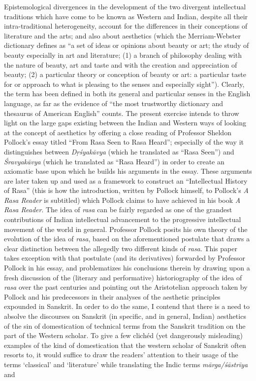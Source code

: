 Epistemological divergences in the development of the two divergent intellectual traditions which have come to be known as Western and Indian, despite all their intra-traditional heterogeneity, account for the differences in their conceptions of literature and the arts; and also about aesthetics (which the Merriam-Webster dictionary defines as “a set of ideas or opinions about beauty or art; the study of beauty especially in art and literature; (1) a branch of philosophy dealing with the nature of beauty, art and taste and with the creation and appreciation of beauty; (2) a particular theory or conception of beauty or art: a particular taste for or approach to what is pleasing to the senses and especially sight”). Clearly, the term has been defined in both its general and particular senses in the English language, as far as the evidence of “the most trustworthy dictionary and thesaurus of American English” counts. The present exercise intends to throw light on the large gaps existing between the Indian and Western ways of looking at the concept of aesthetics by offering a close reading of Professor Sheldon Pollock’s essay titled “From Rasa Seen to Rasa Heard”; especially of the way it distinguishes between \textsl{Dṛśyakāvya} (which he translated as “Rasa Seen”) and \textsl{Śravyakāvya} (which he translated as “Rasa Heard”) in order to create an axiomatic base upon which he builds his arguments in the essay. These arguments are later taken up and used as a framework to construct an “Intellectual History of Rasa” (this is how the introduction, written by Pollock himself, to Pollock’s \textsl{A Rasa Reader} is subtitled) which Pollock claims to have achieved in his book \textsl{A Rasa Reader}. The idea of \textsl{rasa} can be fairly regarded as one of the grandest contributions of Indian intellectual advancement to the progressive intellectual movement of the world in general. Professor Pollock posits his own theory of the evolution of the idea of \textsl{rasa}, based on the aforementioned postulate that draws a clear distinction between the allegedly two different kinds of \textsl{rasa}. This paper takes exception with that postulate (and its derivatives) forwarded by Professor Pollock in his essay, and problematizes his conclusions therein by drawing upon a fresh discussion of the (literary and performative) historiography of the idea of \textsl{rasa} over the past centuries and pointing out the Aristotelian approach taken by Pollock and his predecessors in their analyses of the aesthetic principles expounded in Sanskrit. In order to do the same, I contend that there is a need to absolve the discourses on Sanskrit (in specific, and in general, Indian) aesthetics of the sin of domestication of technical terms from the Sanskrit tradition on the part of the Western scholar. To give a few clichéd (yet dangerously misleading) examples of the kind of domestication that the western scholar of Sanskrit often resorts to, it would suffice to draw the readers’ attention to their usage of the terms ‘classical’ and ‘literature’ while translating the Indic terms \textsl{mārga/śāstrīya} and 